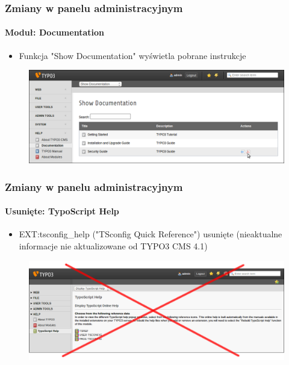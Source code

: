 
\begin{frame}[fragile]
	\frametitle{Zmiany w panelu administracyjnym}
	\framesubtitle{Moduł: Documentation}

	\begin{itemize}
		\item Funkcja "Show Documentation" wyświetla pobrane instrukcje
	\end{itemize}

	\begin{figure}
		\includegraphics[width=0.95\linewidth]{Images/BackendChanges/ShowDocumentation.png}
	\end{figure}

\end{frame}


\begin{frame}[fragile]
	\frametitle{Zmiany w panelu administracyjnym}
	\framesubtitle{Usunięte: TypoScript Help}

 	\begin{itemize}
		\item EXT:tsconfig\_help ("TSconfig Quick Reference") usunięte\newline
			\small(nieaktualne informacje nie aktualizowane od TYPO3 CMS 4.1)
	\end{itemize}

	\begin{figure}
		\includegraphics[width=0.95\linewidth]{Images/BackendChanges/TypoScriptHelpRemovedCrossed.png}
	\end{figure}

\end{frame}


